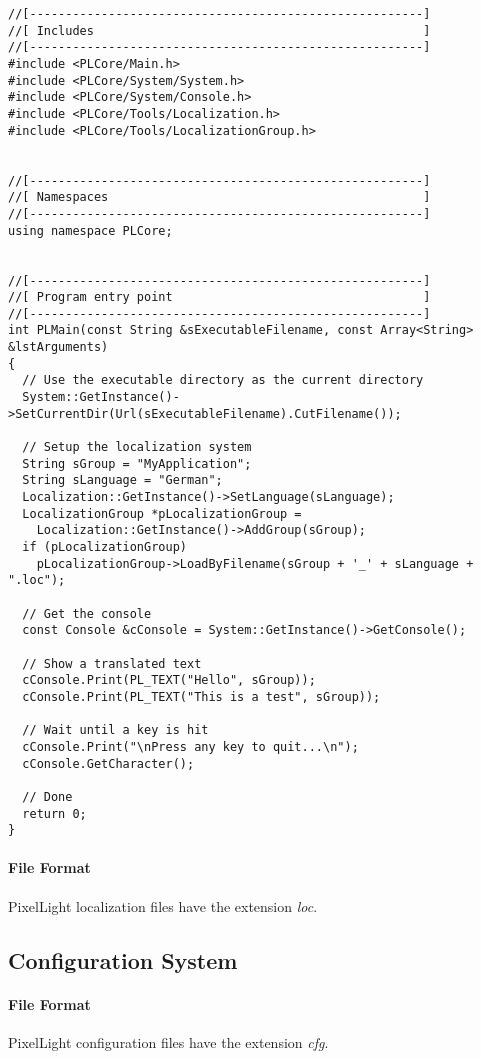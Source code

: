 \begin{lstlisting}[caption=Localization usage example]
//[-------------------------------------------------------]
//[ Includes                                              ]
//[-------------------------------------------------------]
#include <PLCore/Main.h>
#include <PLCore/System/System.h>
#include <PLCore/System/Console.h>
#include <PLCore/Tools/Localization.h>
#include <PLCore/Tools/LocalizationGroup.h>


//[-------------------------------------------------------]
//[ Namespaces                                            ]
//[-------------------------------------------------------]
using namespace PLCore;


//[-------------------------------------------------------]
//[ Program entry point                                   ]
//[-------------------------------------------------------]
int PLMain(const String &sExecutableFilename, const Array<String> &lstArguments)
{
  // Use the executable directory as the current directory
  System::GetInstance()->SetCurrentDir(Url(sExecutableFilename).CutFilename());

  // Setup the localization system
  String sGroup = "MyApplication";
  String sLanguage = "German";
  Localization::GetInstance()->SetLanguage(sLanguage);
  LocalizationGroup *pLocalizationGroup =
    Localization::GetInstance()->AddGroup(sGroup);
  if (pLocalizationGroup)
    pLocalizationGroup->LoadByFilename(sGroup + '_' + sLanguage + ".loc");

  // Get the console
  const Console &cConsole = System::GetInstance()->GetConsole();

  // Show a translated text
  cConsole.Print(PL_TEXT("Hello", sGroup));
  cConsole.Print(PL_TEXT("This is a test", sGroup));

  // Wait until a key is hit
  cConsole.Print("\nPress any key to quit...\n");
  cConsole.GetCharacter();

  // Done
  return 0;
}
\end{lstlisting}


\paragraph{File Format}
PixelLight localization files have the extension \emph{loc}.




\subsection{Configuration System}


\paragraph{File Format}
PixelLight configuration files have the extension \emph{cfg}.
